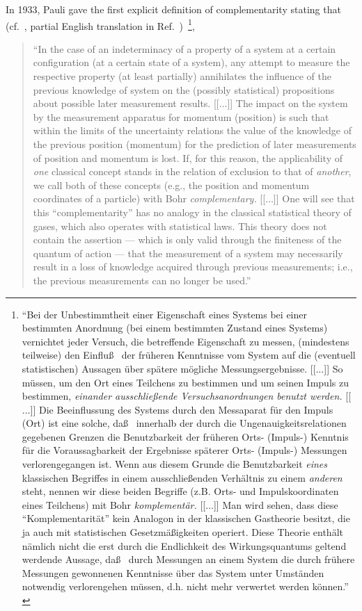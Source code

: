 \documentclass[%
 preprint,
 showpacs,
 showkeys,
 preprintnumbers,
 amsmath,amssymb,
 aps,
 prl,
  longbibliography,
 ]{revtex4-1}
\begin{document}
In 1933, Pauli gave the first explicit definition of complementarity stating that (cf.~\cite[p.~7]{pauli:58},
partial English translation in Ref.~\cite[p.~369]{jammer:89})~\footnote{
{  ``Bei der Unbestimmtheit einer Eigenschaft eines Systems bei einer bestimmten Anordnung
(bei einem bestimmten Zustand eines Systems) vernichtet jeder Versuch, die betreffende Eigenschaft zu messen,
(mindestens teilweise) den Einflu\ss~
der fr{\"u}heren Kenntnisse vom System auf die (eventuell statistischen) Aussagen
{\"u}ber sp{\"a}tere m{\"o}gliche Messungsergebnisse.
[[$\ldots$]]
So m{\"u}ssen, um den Ort eines Teilchens zu bestimmen und um seinen Impuls zu bestimmen,
{\em einander ausschlie\ss ende Versuchsanordnungen benutzt werden.}
[[$\ldots$]]
Die Beeinflussung des Systems durch den Messaparat f{\"u}r den Impuls (Ort)
ist eine solche, da\ss~ innerhalb der durch die Ungenauigkeitsrelationen gegebenen Grenzen
die Benutzbarkeit der fr{\"u}heren Orts- (Impuls-)
Kenntnis f{\"u}r die Voraussagbarkeit der Ergebnisse sp{\"a}terer Orts- (Impuls-) Messungen verlorengegangen ist.
Wenn aus diesem Grunde die Benutzbarkeit {\em eines} klassischen Begriffes in einem
ausschlie\ss enden Verh{\"a}ltnis zu einem {\em anderen} steht, nennen wir diese beiden Begriffe (z.B. Orts- und
Impulskoordinaten eines Teilchens) mit Bohr {\em komplement{\"a}r.}
[[$\ldots$]]
Man wird sehen, dass diese ``Komplementarit{\"a}t'' kein Analogon in
der klassischen Gastheorie besitzt, die ja auch mit statistischen
Gesetzm\"a\ss igkeiten operiert.
Diese Theorie enth{\"a}lt n{\"a}mlich nicht die erst durch die Endlichkeit des Wirkungsquantums
geltend werdende Aussage, da\ss~ durch Messungen an einem System die durch fr{\"u}here Messungen gewonnenen Kenntnisse
{\"u}ber das System unter Umst{\"a}nden notwendig verlorengehen m{\"u}ssen, d.h. nicht mehr verwertet werden k{\"o}nnen.''
}
},
\begin{quote}
{  ``In the case of  an indeterminacy of a property of a system at a certain configuration
(at a certain state of a system), any attempt to measure the respective property (at least partially)
annihilates the influence of the previous knowledge of system on the (possibly statistical) propositions
about possible later measurement results.
[[$\ldots$]]
The impact
on the system by the  measurement apparatus for momentum (position) is such that
within the limits of the uncertainty relations
the value of the knowledge of the previous position (momentum) for the
prediction of later measurements of position and momentum is lost.
If, for this reason, the applicability of {\em one} classical concept stands in the relation of
exclusion to that of {\em another}, we call both of these
concepts (e.g., the position and momentum coordinates of a particle) with Bohr {\em complementary.}
[[$\ldots$]]
One will see that this ``complementarity''
has no analogy in the classical statistical theory of gases,
which also operates with statistical laws.
This theory does not contain the assertion --- which is only valid through the finiteness of the
quantum of action --- that the measurement of a system may necessarily result in a loss
of knowledge acquired through previous measurements; i.e., the previous
measurements can no longer be used.''
}
\end{quote}
\end{document}
